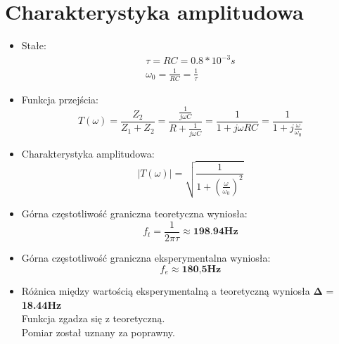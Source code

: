 \section{Charakterystyka amplitudowa}
    \begin{itemize}
        \item Stałe:
            \begin{gather}
                \tau = RC = 0.8 * 10^{-3}s \\
                \omega_0 = \frac{1}{RC} = \frac{1}{\tau}
            \end{gather}
        \item Funkcja przejścia:
            \begin{equation}
                T(\omega) = \frac{Z_2}{Z_1+Z_2} = \frac{\frac{1}{j \omega C}}{{R + \frac{1}{j \omega C}}} = \frac{1}{1 + j \omega RC} = \frac{1}{1 + j \frac{\omega}{\omega_0}}
                \label{eqn:f_przejscia_RC}
            \end{equation}
        \item Charakterystyka amplitudowa:
            \begin{equation}
                |T(\omega)| = \sqrt{\frac{1}{1 + (\frac{\omega}{\omega_0})^2}}
                \label{eqn:char_amp_RC}
            \end{equation}
        \item Górna częstotliwość graniczna teoretyczna wyniosła:
            \begin{equation}
                f_t = \frac{1}{2 \pi \tau} \approx \textbf{198.94Hz}
            \end{equation}
        \item Górna częstotliwość graniczna eksperymentalna wyniosła:
            \begin{equation}
                f_e \approx \textbf{180,5Hz}
            \end{equation}
        \item Różnica między wartością eksperymentalną a teoretyczną wyniosła $\boldsymbol{\Delta}$ = \textbf{18.44Hz}\\
        Funkcja zgadza się z teoretyczną. \\
        Pomiar został uznany za poprawny.
        \begin{figure}[H]
            \centering

\end{figure}
\end{itemize}
